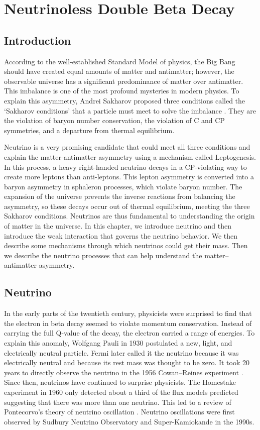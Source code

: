 \chapter{Neutrinoless Double Beta Decay}

\section{Introduction}
According to the well-established Standard Model of physics, the Big Bang should have created equal amounts of matter and antimatter; however, the observable universe has a significant predominance of matter over antimatter. This imbalance is one of the most profound mysteries in modern physics. To explain this asymmetry, Andrei Sakharov proposed three conditions called the `Sakharov conditions' that a particle must meet to solve the imbalance \cite{sakharov_1991}. They are the violation of baryon number conservation, the violation of C and CP symmetries, and a departure from thermal equilibrium.

Neutrino is a very promising candidate that could meet all three conditions and explain the matter-antimatter asymmetry using a mechanism called Leptogenesis. In this process, a heavy right-handed neutrino decays in a CP-violating way to create more leptons than anti-leptons. This lepton asymmetry is converted into a baryon asymmetry in sphaleron processes, which violate baryon number. The expansion of the universe prevents the inverse reactions from balancing the asymmetry, so these decays occur out of thermal equilibrium, meeting the three Sakharov conditions. Neutrinos are thus fundamental to understanding the origin of matter in the universe. In this chapter, we introduce neutrino and then introduce the weak interaction that governs the neutrino behavior. We then describe some mechanisms through which neutrinos could get their mass. Then we describe the neutrino processes that can help understand the matter–antimatter asymmetry.

\section{Neutrino}
In the early parts of the twentieth century, physicists were surprised to find that the electron in beta decay seemed to violate momentum conservation. Instead of carrying the full Q-value of the decay, the electron carried a range of energies. To explain this anomaly, Wolfgang Pauli in 1930 postulated a new, light, and electrically neutral particle. Fermi later called it the neutrino because it was electrically neutral and because its rest mass was thought to be zero. It took 20 years to directly observe the neutrino in the 1956 Cowan–Reines experiment \cite{PhysRev.92.830}. Since then, neutrinos have continued to surprise physicists. The Homestake experiment in 1960 only detected about a third of the flux models predicted \cite{Cleveland:1998nv} suggesting that there was more than one neutrino. This led to a review of Pontecorvo’s theory of neutrino oscillation \cite{Pontecorvo:1967fh}. Neutrino oscillations were first observed by Sudbury Neutrino Observatory \cite{SNO:2001kpb} and Super-Kamiokande \cite{Super_Kamiokande_1998kpq} in the 1990s. 

